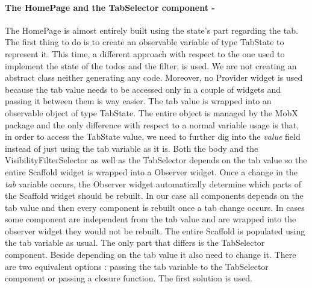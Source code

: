 \paragraph{The HomePage and the TabSelector component - }
\label{subpar:todo_app_bloc_core_state}The HomePage is almost entirely built using the state's part regarding the tab. The first thing to do is to create an observable variable of type TabState to represent it. This time, a different approach with respect to the one used to implement the state of the todos and the filter, is used. We are not creating an abstract class neither generating any code. Moreover, no Provider widget is used because the tab value needs to be accessed only in a couple of widgets and passing it between them is way easier. The tab value is wrapped into an observable object of type TabState. The entire object is managed by the MobX package and the only difference with respect to a normal variable usage is that, in order to access the TabState value, we need to further dig into the \textit{value} field instead of just using the tab variable as it is. Both the body and the VisibilityFilterSelector as well as the TabSelector depends on the tab value so the entire Scaffold widget is wrapped into a Observer widget. Once a change in the \textit{tab} variable occurs, the Observer widget automatically determine which parts of the Scaffold widget should be rebuilt. In our case all components depends on the tab value and then every component is rebuilt once a tab change occurs. In cases some component are independent from the tab value and are wrapped into the observer widget they would not be rebuilt. The entire Scaffold is populated using the tab variable as usual. The only part that differs is the TabSelector component. Beside depending on the tab value it also need to change it. There are two equivalent options : passing the tab variable to the TabSelector component or passing a closure function. The first solution is used. 
